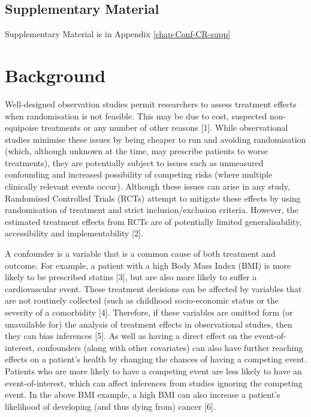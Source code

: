 \documentclass[12pt,PhD,twoside,openright]{muthesis}
\begin{document}
\hypertarget{supplementary-material}{%
\subsection*{Supplementary Material}\label{supplementary-material}}

Supplementary Material is in Appendix \ref{chap-Conf-CR-supp}

\hypertarget{background-1}{%
\section{Background}\label{background-1}}

Well-designed observation studies permit researchers to assess treatment effects when randomisation is not feasible. This may be due to cost, suspected non-equipoise treatments or any number of other reasons {[}1{]}. While observational studies minimise these issues by being cheaper to run and avoiding randomisation (which, although unknown at the time, may prescribe patients to worse treatments), they are potentially subject to issues such as unmeasured confounding and increased possibility of competing risks (where multiple clinically relevant events occur). Although these issues can arise in any study, Randomised Controlled Trials (RCTs) attempt to mitigate these effects by using randomisation of treatment and strict inclusion/exclusion criteria. However, the estimated treatment effects from RCTs are of potentially limited generalisability, accessibility and implementability {[}2{]}.

A confounder is a variable that is a common cause of both treatment and outcome. For example, a patient with a high Body Mass Index (BMI) is more likely to be prescribed statins {[}3{]}, but are also more likely to suffer a cardiovascular event. These treatment decisions can be affected by variables that are not routinely collected (such as childhood socio-economic status or the severity of a comorbidity {[}4{]}. Therefore, if these variables are omitted form (or unavailable for) the analysis of treatment effects in observational studies, then they can bias inferences {[}5{]}. As well as having a direct effect on the event-of-interest, confounders (along with other covariates) can also have further reaching effects on a patient's health by changing the chances of having a competing event. Patients who are more likely to have a competing event are less likely to have an event-of-interest, which can affect inferences from studies ignoring the competing event. In the above BMI example, a high BMI can also increase a patient's likelihood of developing (and thus dying from) cancer {[}6{]}.
\end{document}
